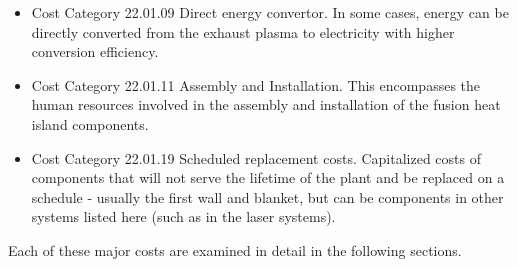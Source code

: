 \begin{itemize}
    \item Cost Category 22.01.09 Direct energy convertor. In some cases, energy can be directly converted from the exhaust plasma to electricity with higher conversion efficiency.
    
    \item Cost Category 22.01.11 Assembly and Installation. This encompasses the human resources involved in the assembly and installation of the fusion heat island components.

    \item Cost Category 22.01.19 Scheduled replacement costs.  Capitalized costs of components that will not serve the lifetime of the plant and be replaced on a schedule - usually the first wall and blanket, but can be components in other systems listed here (such as in the laser systems).
 \end{itemize}


Each of these major costs are examined in detail in the following sections.